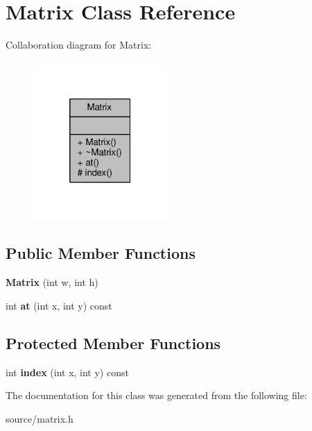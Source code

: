 \hypertarget{classMatrix}{}\section{Matrix Class Reference}
\label{classMatrix}


Collaboration diagram for Matrix\+:
\nopagebreak
\begin{figure}[H]
\begin{center}
\leavevmode
\includegraphics[width=145pt]{classMatrix__coll__graph}
\end{center}
\end{figure}
\subsection*{Public Member Functions}
\begin{DoxyCompactItemize}
\item 
\hypertarget{classMatrix_ae940d9b978841f5f497b7b7f81c63d23}{}{\bfseries Matrix} (int w, int h)\label{classMatrix_ae940d9b978841f5f497b7b7f81c63d23}

\item 
\hypertarget{classMatrix_a99fbc0ee3fe5a4cc6ba9b8b91244387a}{}int {\bfseries at} (int x, int y) const \label{classMatrix_a99fbc0ee3fe5a4cc6ba9b8b91244387a}

\end{DoxyCompactItemize}
\subsection*{Protected Member Functions}
\begin{DoxyCompactItemize}
\item 
\hypertarget{classMatrix_a29ad13a5d17d7be2b7c0cdcb93b600fe}{}int {\bfseries index} (int x, int y) const \label{classMatrix_a29ad13a5d17d7be2b7c0cdcb93b600fe}

\end{DoxyCompactItemize}


The documentation for this class was generated from the following file\+:\begin{DoxyCompactItemize}
\item 
source/matrix.\+h\end{DoxyCompactItemize}
